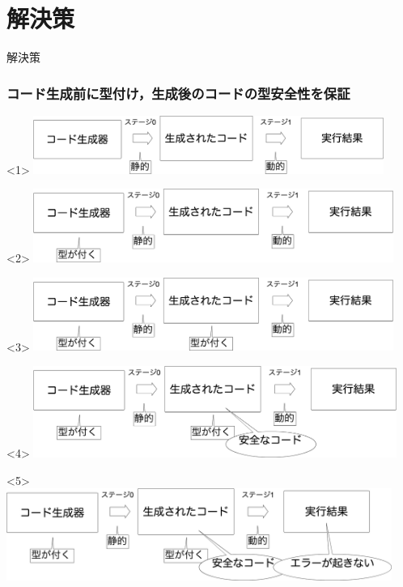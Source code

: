 \section{解決策}

\begin{frame}
  \center
  \huge{解決策}
\end{frame}

\begin{frame}
  \frametitle{コード生成前に型付け，生成後のコードの型安全性を保証}
  \begin{onlyenv}<1>
    \center
    \includegraphics[clip,height=1.9cm]{./img/prggen.png}
  \end{onlyenv}

  \begin{onlyenv}<2>
    \center
    \includegraphics[clip,height=2.4cm]{./img/prggen_type1.png}
  \end{onlyenv}

  \begin{onlyenv}<3>
    \center
    \includegraphics[clip,height=2.4cm]{./img/prggen_type2.png}
  \end{onlyenv}

  \begin{onlyenv}<4>
    \center
    \includegraphics[clip,height=3.0cm]{./img/prggen_type3.png}
  \end{onlyenv}

  \begin{onlyenv}<5>
    \center
    \includegraphics[clip,height=3.0cm]{./img/prggen_type4.png}
  \end{onlyenv}
\end{frame}


